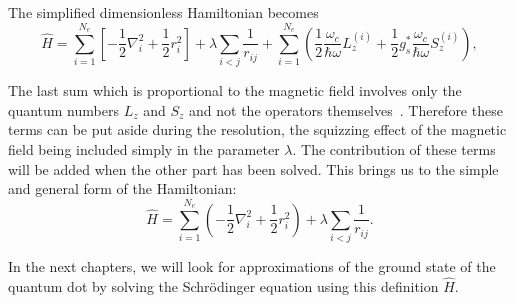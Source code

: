 

The simplified dimensionless Hamiltonian becomes
\begin{equation}
\label{eq:dimlessH}
  \hat{H}=\sum_{i=1}^{N_e} \left[  -\frac{1}{2} \nabla_i^2 + \frac{1}{2} r_i^2  \right]+ \lambda \sum_{i<j}\frac{1}{r_{ij}} +  \sum_{i=1}^{N_e} \left(  \frac{1}{2}  \frac{\omega_c}{\hbar \omega} L_z^{(i)}+ \frac{1  }{2} g_s^* \frac{\omega_c}{\hbar \omega} S_z^{(i)}\right),
\end{equation}

The last sum which is proportional to the magnetic field involves only the quantum numbers $L_z$ and $S_z$ and not the operators themselves~\cite{Tavernier2003}. Therefore these terms can be put aside during the resolution, the squizzing effect of the magnetic field being included simply in the parameter $\lambda$. The contribution of these terms will be added when the other part has been solved. This brings us to the simple and general form of the Hamiltonian:
\begin{equation}
\label{eq:lambdaSimp}
\hat{H}=\sum_{i=1}^{N_e} \left(  -\frac{1}{2} \nabla_i^2 + \frac{1}{2} r_i^2  \right)+ \lambda \sum_{i<j}\frac{1}{r_{ij}}.
\end{equation}

In the next chapters, we will look for approximations of the ground state of the quantum dot by solving the Schr\"odinger equation using this definition $\hat{H}$.


% 
% 
% 
% 

